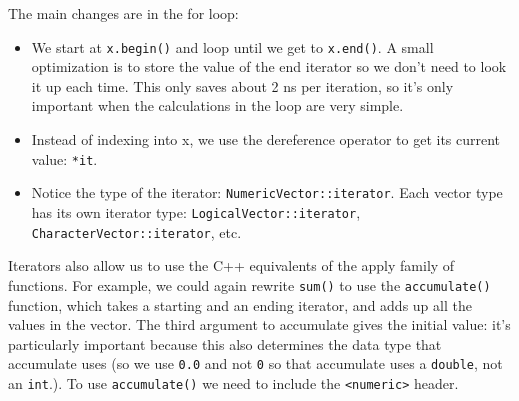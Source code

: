 \begin{Shaded}
\begin{Highlighting}[]
  

 
   \NormalTok{;}
  
  \NormalTok{\}}
   
\NormalTok{\}}
\end{Highlighting}
\end{Shaded}

The main changes are in the for loop:

\begin{itemize}
\item
  We start at \texttt{x.begin()} and loop until we get to
  \texttt{x.end()}. A small optimization is to store the value of the
  end iterator so we don't need to look it up each time. This only saves
  about 2 ns per iteration, so it's only important when the calculations
  in the loop are very simple.
\item
  Instead of indexing into x, we use the dereference operator to get its
  current value: \texttt{*it}.
\item
  Notice the type of the iterator: \texttt{NumericVector::iterator}.
  Each vector type has its own iterator type:
  \texttt{LogicalVector::iterator}, \texttt{CharacterVector::iterator},
  etc.
\end{itemize}

Iterators also allow us to use the C++ equivalents of the apply family
of functions. For example, we could again rewrite \texttt{sum()} to use
the \texttt{accumulate()} function, which takes a starting and an ending
iterator, and adds up all the values in the vector. The third argument
to accumulate gives the initial value: it's particularly important
because this also determines the data type that accumulate uses (so we
use \texttt{0.0} and not \texttt{0} so that accumulate uses a
\texttt{double}, not an \texttt{int}.). To use \texttt{accumulate()} we
need to include the \texttt{\textless{}numeric\textgreater{}} header.

\begin{Shaded}
\begin{Highlighting}[]
  

 
   \NormalTok{);}
\NormalTok{\}}
\end{Highlighting}
\end{Shaded}

